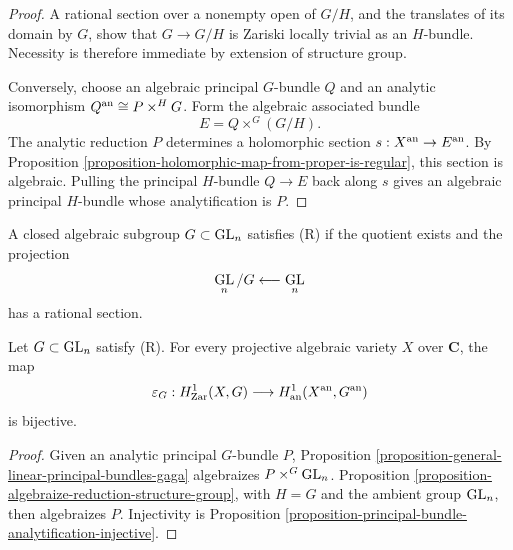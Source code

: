 \begin{proof}
A rational section over a nonempty open of $G/H$, and the translates of
its domain by $G$, show that $G\to G/H$ is Zariski locally trivial as an
$H$-bundle.
Necessity is therefore immediate by extension of structure group.

Conversely, choose an algebraic principal $G$-bundle $Q$ and an analytic
isomorphism $Q^{\rm an}\cong P\times^H G$. Form the algebraic associated
bundle
$$
E=Q\times^G(G/H).
$$
The analytic reduction $P$ determines a holomorphic section
$s:X^{\rm an}\to E^{\rm an}$. By Proposition
\ref{proposition-holomorphic-map-from-proper-is-regular}, this section is
algebraic. Pulling the principal $H$-bundle $Q\to E$ back along $s$ gives an
algebraic principal $H$-bundle whose analytification is $P$.
\end{proof}

\begin{definition}
\label{definition-rational-section-condition}
\begin{reference}
\cite[\S 4, no. 20, condition (R)]{GAGA}
\end{reference}
A closed algebraic subgroup $G\subset\mathop{\rm GL}_n$ satisfies
\textup{(R)} if the quotient exists and the projection
$$
\mathop{\rm GL}_n/G\longleftarrow\mathop{\rm GL}_n
$$
has a rational section.
\end{definition}

\begin{proposition}
\label{proposition-rational-section-principal-bundles-gaga}
\begin{reference}
\cite[\S 4, no. 20, Proposition 20]{GAGA}
\end{reference}
Let $G\subset\mathop{\rm GL}_n$ satisfy \textup{(R)}. For every projective
algebraic variety $X$ over $\mathbf C$, the map
$$
\varepsilon_G:H^1_{\rm Zar}(X,G)
\longrightarrow H^1_{\rm an}(X^{\rm an},G^{\rm an})
$$
is bijective.
\end{proposition}

\begin{proof}
Given an analytic principal $G$-bundle $P$, Proposition
\ref{proposition-general-linear-principal-bundles-gaga} algebraizes
$P\times^G\mathop{\rm GL}_n$. Proposition
\ref{proposition-algebraize-reduction-structure-group}, with
$H=G$ and the ambient group $\mathop{\rm GL}_n$, then algebraizes $P$.
Injectivity is Proposition
\ref{proposition-principal-bundle-analytification-injective}.
\end{proof}


